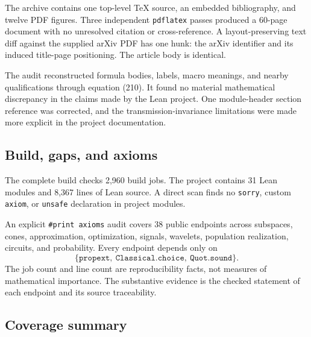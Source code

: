\documentclass[11pt,a4paper]{article}
\begin{document}
The archive contains one top-level TeX source, an embedded bibliography, and
twelve PDF figures. Three independent \texttt{pdflatex} passes produced a
60-page document with no unresolved citation or cross-reference. A
layout-preserving text diff against the supplied arXiv PDF has one hunk:
the arXiv identifier and its induced title-page positioning. The article
body is identical.

The audit reconstructed formula bodies, labels, macro meanings, and nearby
qualifications through equation (210). It found no material mathematical
discrepancy in the claims made by the Lean project. One module-header section
reference was corrected, and the transmission-invariance limitations were
made more explicit in the project documentation.

\subsection{Build, gaps, and axioms}

The complete build checks 2,960 build jobs. The project contains 31 Lean
modules and 8,367 lines of Lean source. A direct scan finds no
\texttt{sorry}, custom \texttt{axiom}, or \texttt{unsafe} declaration in
project modules.

An explicit \texttt{\#print axioms} audit covers 38 public endpoints across
subspaces, cones, approximation, optimization, signals, wavelets,
population realization, circuits, and probability. Every endpoint depends
only on
\[
  \{\texttt{propext},\ \texttt{Classical.choice},\ \texttt{Quot.sound}\}.
\]
The job count and line count are reproducibility facts, not measures of
mathematical importance. The substantive evidence is the checked statement
of each endpoint and its source traceability.

\subsection{Coverage summary}
\end{document}

